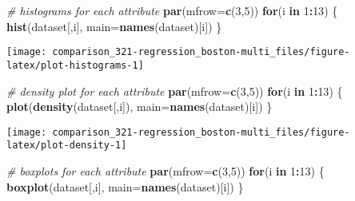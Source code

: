 \documentclass[]{book}
\newenvironment{Shaded}{\begin{snugshade}}{\end{snugshade}}
\newcommand{\CommentTok}[1]{\textcolor[rgb]{0.56,0.35,0.01}{\textit{#1}}}
\newcommand{\ControlFlowTok}[1]{\textcolor[rgb]{0.13,0.29,0.53}{\textbf{#1}}}
\newcommand{\DataTypeTok}[1]{\textcolor[rgb]{0.13,0.29,0.53}{#1}}
\newcommand{\DecValTok}[1]{\textcolor[rgb]{0.00,0.00,0.81}{#1}}
\newcommand{\KeywordTok}[1]{\textcolor[rgb]{0.13,0.29,0.53}{\textbf{#1}}}
\newcommand{\NormalTok}[1]{#1}
\newcommand{\OperatorTok}[1]{\textcolor[rgb]{0.81,0.36,0.00}{\textbf{#1}}}
\begin{document}
\begin{Shaded}
\begin{Highlighting}[]
\CommentTok{# histograms for each attribute}
\KeywordTok{par}\NormalTok{(}\DataTypeTok{mfrow=}\KeywordTok{c}\NormalTok{(}\DecValTok{3}\NormalTok{,}\DecValTok{5}\NormalTok{))}
\ControlFlowTok{for}\NormalTok{(i }\ControlFlowTok{in} \DecValTok{1}\OperatorTok{:}\DecValTok{13}\NormalTok{) \{}
    \KeywordTok{hist}\NormalTok{(dataset[,i], }\DataTypeTok{main=}\KeywordTok{names}\NormalTok{(dataset)[i])}
\NormalTok{\}}
\end{Highlighting}
\end{Shaded}

\begin{center}\texttt{[image: comparison\_321-regression\_boston-multi\_files/figure-latex/plot-histograms-1]} \end{center}

\begin{Shaded}
\begin{Highlighting}[]
\CommentTok{# density plot for each attribute}
\KeywordTok{par}\NormalTok{(}\DataTypeTok{mfrow=}\KeywordTok{c}\NormalTok{(}\DecValTok{3}\NormalTok{,}\DecValTok{5}\NormalTok{))}
\ControlFlowTok{for}\NormalTok{(i }\ControlFlowTok{in} \DecValTok{1}\OperatorTok{:}\DecValTok{13}\NormalTok{) \{}
\KeywordTok{plot}\NormalTok{(}\KeywordTok{density}\NormalTok{(dataset[,i]), }\DataTypeTok{main=}\KeywordTok{names}\NormalTok{(dataset)[i])}
\NormalTok{\}}
\end{Highlighting}
\end{Shaded}

\begin{center}\texttt{[image: comparison\_321-regression\_boston-multi\_files/figure-latex/plot-density-1]} \end{center}

\begin{Shaded}
\begin{Highlighting}[]
\CommentTok{# boxplots for each attribute}
\KeywordTok{par}\NormalTok{(}\DataTypeTok{mfrow=}\KeywordTok{c}\NormalTok{(}\DecValTok{3}\NormalTok{,}\DecValTok{5}\NormalTok{))}
\ControlFlowTok{for}\NormalTok{(i }\ControlFlowTok{in} \DecValTok{1}\OperatorTok{:}\DecValTok{13}\NormalTok{) \{}
\KeywordTok{boxplot}\NormalTok{(dataset[,i], }\DataTypeTok{main=}\KeywordTok{names}\NormalTok{(dataset)[i])}
\NormalTok{\}}
\end{Highlighting}
\end{Shaded}
\end{document}
